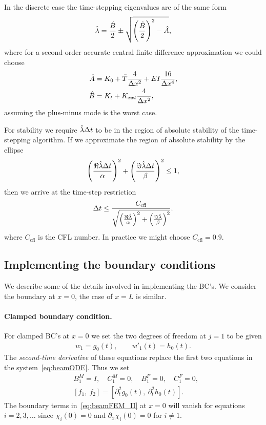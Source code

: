 \documentclass[11pt]{article}
\newcommand{\dt}{{\Delta t}}
\newcommand{\Ts}{\bar{T}}
\begin{document}
In the discrete case the time-stepping eigenvalues are of the same form
\begin{align*}
  \hat{\lambda} = \frac{\hat{B}}{2} \pm \sqrt{ \left(\frac{\hat{B}}{2}\right)^2 - \hat{A}} ,
\end{align*}
where for a second-order accurate central finite difference approximation we could choose
\begin{align*}
  \Ahat &= K_0 + \Ts\frac{4}{\dx^2} + E I\frac{16}{\dx^4}, \\
  \Bhat &= K_t+ K_{xxt}\frac{4}{\dx^2} ,
\end{align*}
assuming the plus-minus mode is the worst case.

For stability we require $\lambdaHat\dt$ to be in the region of absolute stability of the time-stepping
algorithm.
If we approximate the region of absolute stability by the ellipse
\begin{align*}
   \left(\frac{\Re\lambdaHat\dt}{\alpha}\right)^2  + \left(\frac{\Im\lambdaHat\dt}{\beta}\right)^2 \le 1,
\end{align*}
then we arrive at the time-step restriction
\begin{align*}
   \dt \le \frac{C_\text{cfl}}{\sqrt{ \left(\frac{\Re\lambdaHat}{\alpha}\right)^2  + \left(\frac{\Im\lambdaHat}{\beta}\right)^2}}. 
\end{align*}
where $C_\text{cfl}$ is the CFL number. In practice we might choose $C_\text{cfl}=0.9$. 

\subsection{Implementing the boundary conditions} \label{eq:BeamModel_FEM_BC}

We describe some of the details involved in implementing the BC's. We consider the 
boundary at $x=0$, the case of $x=L$ is similar. 

\paragraph{Clamped boundary condition.} For clamped BC's at $x=0$ we set the two degrees of
freedom at $j=1$ to be given
\begin{align}
  w_1 = g_0(t), \qquad w'_1(t)=h_0(t).
\end{align}
The {\em second-time derivative} of these equations replace the first two equations in the system~\eqref{eq:beamODE}. 
Thus we set 
\begin{align*}
&  B_1^M=I, \quad C_1^M=0, \quad B^F_1=0, \quad C^F_1=0 , \\
&  [f_1, ~f_2]=[\partial_t^2g_0(t), ~\partial_t^2 h_0(t)].
\end{align*}
The boundary terms in~\eqref{eq:beamFEM_II} at $x=0$ will vanish for equations $i=2,3,\ldots$ 
since $\chi_i(0)=0$ and $\partial_x\chi_i(0)=0$
for $i\ne 1$.
\end{document}
